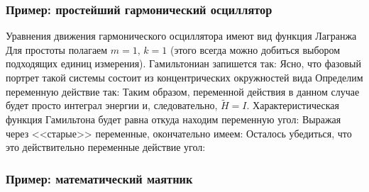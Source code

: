 \documentclass[a4paper,12pt]{article}
\newcommand{\ti}[1]{\widetilde{{#1}}}
\begin{document}
\subsubsection{Пример: простейший гармонический осциллятор}

Уравнения движения гармонического осциллятора имеют вид
функция Лагранжа
Для простоты полагаем $m=1,\,k=1$ (этого всегда можно добиться выбором подходящих единиц измерения).
Гамильтониан запишется так:
Ясно, что фазовый портрет такой системы состоит из концентрических окружностей вида 
Определим переменную действие так:
Таким образом, переменной действия в данном случае будет просто интеграл энергии и, следовательно, $\ti H=I$.
Характеристическая функция Гамильтона будет равна
откуда находим переменную угол:
Выражая через <<старые>> переменные, окончательно имеем:
Осталось убедиться, что это действительно переменные действие угол:
\equ{\dot{\om}=\pf{\ti H}{I}=1,\quad \dot I=-\pf{\ti H}{\om}=0.}

\subsubsection{Пример: математический маятник}
\end{document}
